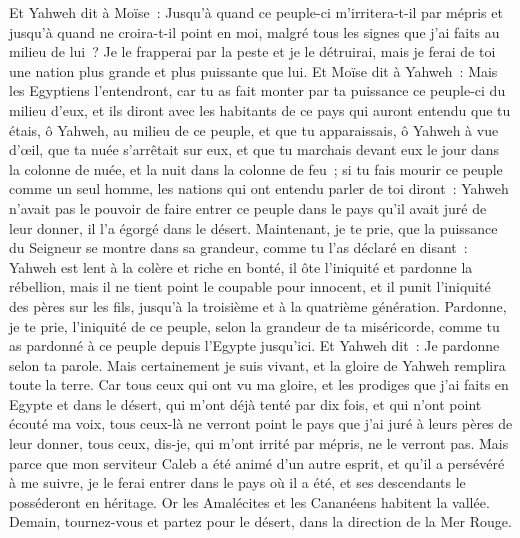 \begin{multicols}{2}
Et Yahweh dit à Moïse~: Jusqu'à quand ce peuple-ci m'irritera-t-il par mépris et jusqu'à quand ne croira-t-il point en moi, malgré tous les signes que j'ai faits au milieu de lui~?
Je le frapperai par la peste et je le détruirai, mais je ferai de toi une nation plus grande et plus puissante que lui.
Et Moïse dit à Yahweh~: Mais les Egyptiens l'entendront, car tu as fait monter par ta puissance ce peuple-ci du milieu d'eux,
et ils diront avec les habitants de ce pays qui auront entendu que tu étais, ô Yahweh, au milieu de ce peuple, et que tu apparaissais, ô Yahweh à vue d'œil, que ta nuée s'arrêtait sur eux, et que tu marchais devant eux le jour dans la colonne de nuée, et la nuit dans la colonne de feu~;
si tu fais mourir ce peuple comme un seul homme, les nations qui ont entendu parler de toi diront~:
Yahweh n'avait pas le pouvoir de faire entrer ce peuple dans le pays qu'il avait juré de leur donner, il l'a égorgé dans le désert.
Maintenant, je te prie, que la puissance du Seigneur se montre dans sa grandeur, comme tu l'as déclaré en disant~:
Yahweh est lent à la colère et riche en bonté, il ôte l'iniquité et pardonne la rébellion, mais il ne tient point le coupable pour innocent, et il punit l'iniquité des pères sur les fils, jusqu'à la troisième et à la quatrième génération.
Pardonne, je te prie, l'iniquité de ce peuple, selon la grandeur de ta miséricorde, comme tu as pardonné à ce peuple depuis l'Egypte jusqu'ici.
Et Yahweh dit~: Je pardonne selon ta parole.
Mais certainement je suis vivant, et la gloire de Yahweh remplira toute la terre.
Car tous ceux qui ont vu ma gloire, et les prodiges que j'ai faits en Egypte et dans le désert, qui m'ont déjà tenté par dix fois, et qui n'ont point écouté ma voix,
tous ceux-là ne verront point le pays que j'ai juré à leurs pères de leur donner, tous ceux, dis-je, qui m'ont irrité par mépris, ne le verront pas.
Mais parce que mon serviteur Caleb a été animé d'un autre esprit, et qu'il a persévéré à me suivre, je le ferai entrer dans le pays où il a été, et ses descendants le posséderont en héritage.
Or les Amalécites et les Cananéens habitent la vallée. Demain, tournez-vous et partez pour le désert, dans la direction de la Mer Rouge.

\end{multicols}
